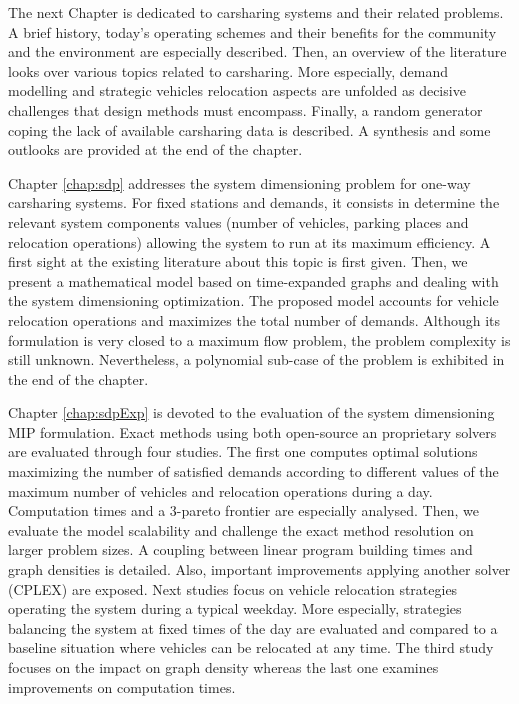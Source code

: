 \begin{bibunit}[ieeetr]
\medskip
The next Chapter is dedicated to carsharing systems and their related problems.
A brief history, today's operating schemes and their benefits for the community and the environment are especially described.
Then, an overview of the literature looks over various topics related to carsharing.
More especially, demand modelling and strategic vehicles relocation aspects are unfolded as decisive challenges that design methods must encompass.
Finally, a random generator coping the lack of available carsharing data is described.
A synthesis and some outlooks are provided at the end of the chapter.


\medskip
Chapter \ref{chap:sdp} addresses the system dimensioning problem for one-way carsharing systems.
For fixed stations and demands, it consists in determine the relevant system components values (number of vehicles, parking places and relocation operations) allowing the system to run at its maximum efficiency.
A first sight at the existing literature about this topic is first given.
Then, we present a mathematical model based on time-expanded graphs and dealing with the system dimensioning optimization.
The proposed model accounts for vehicle relocation operations and maximizes the total number of demands.
Although its formulation is very closed to a maximum flow problem, the problem complexity is still unknown.
Nevertheless, a polynomial sub-case of the problem is exhibited in the end of the chapter.

\medskip
Chapter \ref{chap:sdpExp} is devoted to the evaluation of the system dimensioning MIP formulation.
Exact methods using both open-source an proprietary solvers are evaluated through four studies.
The first one computes optimal solutions maximizing the number of satisfied demands according to different values of the maximum number of vehicles and relocation operations during a day.
Computation times and a 3-pareto frontier are especially analysed.
Then, we evaluate the model scalability and challenge the exact method resolution on larger problem sizes.
A coupling between linear program building times and graph densities is detailed.
Also, important improvements applying another solver (CPLEX) are exposed.
Next studies focus on vehicle relocation strategies operating the system during a typical weekday.
More especially, strategies balancing the system at fixed times of the day are evaluated and compared to a baseline situation where vehicles can be relocated at any time.
The third study focuses on the impact on graph density whereas the last one examines improvements on computation times.



\end{bibunit}
